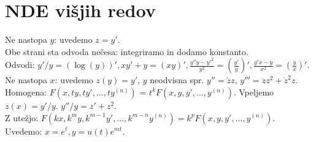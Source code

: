 \documentclass[10pt,a4paper]{amsart}
\theoremstyle{definition} %
\theoremstyle{plain} %
\newcommand{\dx}{\ensuremath{\,\mathrm{d}x}}
\let\oldint\int
\renewcommand{\int}{\oldint \!}
\begin{document}
\section*{NDE višjih redov}
Ne nastopa $y$: uvedemo $z = y'$. \\ Obe
strani sta odvoda nečesa: integriramo in dodamo konstanto. \\ \hspace*{20pt}
Odvodi: $y'/y = (\log(y))', x y' + y = (xy)', \frac{y'' y - y'^2}{y^2} =
(\frac{y'}{y})', \frac{y' x - y}{x^2} = (\frac{y}{x})'$.\\ Ne nastopa $x$:
uvedemo $z(y) = y'$, $y$ neodvisna spr. $y'' = \dot{z}z$, $y''' = \ddot{z}z^2 +
\dot{z}^2z$. \\ Homogena: $F(x, ty, ty', \dots, ty^{(n)})$ = $t^k F(x, y, y',
\dots,  y^{(n)})$. Vpeljemo $z(x) = y'/y$. $y''/y = z' + z^2$.\\ Z utežjo:
$F(kx, k^my, k^{m-1}y', \dots, k^{m-n}y^{(n)}) = k^pF(x, y, y', \dots,
y^{(n)})$. Uvedemo: $x = e^t, y = u(t)e^{mt}$.
%
%
%
\end{document}
